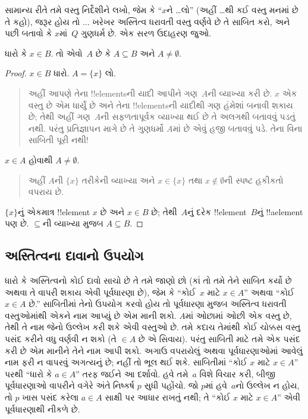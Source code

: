 \documentclass[../../../include/open-logic-section]{subfiles}
\begin{document}
સામાન્ય રીતે તમે વસ્તુ નિર્દેશીને લખો, જેમ કે ``$x$ને
\dots લો'' (અહીં \dots{}થી કઈ વસ્તુ મનમાં છે તે કહો), જરૂર
હોય તો $\dots$ ખરેખર અસ્તિત્વ ધરાવતી વસ્તુ વર્ણવે છે તે
સાબિત કરો, અને પછી બતાવો કે $x$માં~$Q$ ગુણધર્મ છે. એક
સરળ ઉદાહરણ જુઓ.

\begin{prop}
  ધારો કે $x \in B$. તો એવો~$A$ છે કે $A \subseteq
  B$ અને $A \neq \emptyset$.
\end{prop}

\begin{proof}
  $x \in B$ ધારો. $A = \{x\}$ લો.
  \begin{quote}
    અહીં આપણે તેના !!{element}sની યાદી આપીને ગણ~$A$ની
    વ્યાખ્યા કરી છે. $x$ એક વસ્તુ છે એમ ધાર્યું છે અને તેના
    !!{element}sની યાદીથી ગણ હંમેશાં બનાવી શકાય છે; તેથી અહીં
    ગણ~$A$ની સફળતાપૂર્વક વ્યાખ્યા થઈ છે તે અલગથી બતાવવું
    પડતું નથી. પરંતુ પ્રતિજ્ઞાપન માગે છે તે ગુણધર્મો $A$માં
    છે એવું હજી બતાવવું પડે. તેના વિના સાબિતી પૂરી નથી!{}
  \end{quote}
  $x \in A$ હોવાથી $A \neq \emptyset$.
  \begin{quote}
    અહીં $A$ની $\{x\}$ તરીકેની વ્યાખ્યા અને $x \in \{x\}$
    તથા $x \notin \emptyset$ની સ્પષ્ટ હકીકતો વપરાય છે.
  \end{quote}
  $\{x\}$નું એકમાત્ર !!{element} $x$ છે અને $x \in B$ છે;
  તેથી~$A$નું દરેક !!{element}~$B$નું !!a{element} પણ છે.
  $\subseteq$ની વ્યાખ્યા મુજબ $A \subseteq B$.
\end{proof}

\subsection{અસ્તિત્વના દાવાનો ઉપયોગ}

ધારો કે અસ્તિત્વનો કોઈ દાવો સાચો છે તે તમે જાણો છો (કાં તો
તમે તેને સાબિત કર્યો છે અથવા તે વાપરી શકાય એવી પૂર્વધારણા છે),
જેમ કે ``કોઈ~$x$ માટે $x \in A$'' અથવા ``કોઈ $x \in A$
છે.'' સાબિતીમાં તેનો ઉપયોગ કરવો હોય તો પૂર્વધારણા મુજબ
અસ્તિત્વ ધરાવતી વસ્તુઓમાંથી એકને નામ આપ્યું છે એમ માની શકો.
$A$માં ઓછામાં ઓછી એક વસ્તુ છે, તેથી તે નામ જેનો ઉલ્લેખ
કરી શકે એવી વસ્તુઓ છે. તમે કદાચ તેમાંથી કોઈ ચોક્કસ વસ્તુ
પસંદ કરીને વધુ વર્ણવી ન શકો (તે $\in A$ છે એ સિવાય).
પરંતુ સાબિતી માટે તમે એક પસંદ કરી છે એમ માનીને તેને નામ
આપી શકો. અગાઉ વપરાયેલું અથવા પૂર્વધારણાઓમાં આવેલું નામ
ફરી ન વાપરવું અગત્યનું છે; નહીં તો ભૂલ થઈ શકે. સાબિતીમાં
``કોઈ $x$ માટે $x \in A$'' પરથી ``ધારો કે $a
\in A$'' તરફ જઈને આ દર્શાવો. હવે તમે~$a$ વિશે વિચાર કરી,
બીજી પૂર્વધારણાઓ વાપરીને વગેરે અંતે નિષ્કર્ષ $p$ સુધી પહોંચો.
જો $p$માં હવે~$a$નો ઉલ્લેખ ન હોય, તો $p$ ખાસ પસંદ કરેલા
$a \in A$ સાક્ષી પર આધાર રાખતું નથી; તે ``કોઈ $x$ માટે
$x \in A$'' એવી પૂર્વધારણાથી નીકળે છે.
\end{document}
